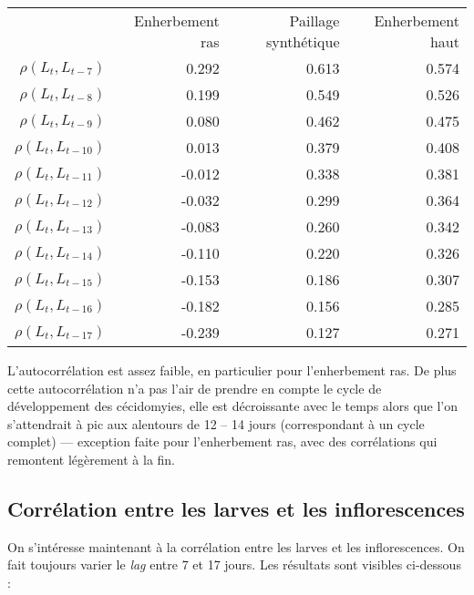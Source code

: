 \documentclass[a4paper, 11pt]{article}
\begin{document}
\begin{center}
\begin{tabular}{rrrr}
 & Enherbement ras & Paillage synthétique & Enherbement haut \\
$\rho\left( L_t, L_{t-7} \right)    $ &  0.292 & 0.613 & 0.574\\
$\rho\left( L_t, L_{t-8} \right)    $&  0.199 &  0.549 & 0.526 \\
$\rho\left( L_t, L_{t-9} \right)    $&  0.080&   0.462 & 0.475\\
$\rho\left( L_t, L_{t-10} \right)    $&  0.013&  0.379 & 0.408 \\
$\rho\left( L_t, L_{t-11} \right)    $& -0.012 & 0.338 & 0.381 \\
$\rho\left( L_t, L_{t-12} \right)    $& -0.032 & 0.299 & 0.364     \\
$\rho\left( L_t, L_{t-13} \right)    $& -0.083 & 0.260 & 0.342    \\
$\rho\left( L_t, L_{t-14} \right)    $& -0.110 & 0.220 & 0.326         \\
$\rho\left( L_t, L_{t-15} \right)    $& -0.153 & 0.186 & 0.307          \\
$\rho\left( L_t, L_{t-16} \right)    $& -0.182 & 0.156 & 0.285           \\
$\rho\left( L_t, L_{t-17} \right)    $& -0.239 & 0.127 & 0.271             
\end{tabular}
\end{center}

L'autocorrélation est assez faible, en particulier pour l'enherbement ras. De plus cette autocorrélation n'a pas l'air de prendre en compte le cycle de développement des cécidomyies, elle est décroissante avec le temps alors que l'on s'attendrait à pic aux alentours de 12 -- 14 jours (correspondant à un cycle complet) --- exception faite pour l'enherbement ras, avec des corrélations qui remontent légèrement à la fin. 

\subsection{Corrélation entre les larves et les inflorescences}

On s'intéresse maintenant à la corrélation entre les larves et les inflorescences. On fait toujours varier le \emph{lag} entre 7 et 17 jours. Les résultats sont visibles ci-dessous :
\end{document}
